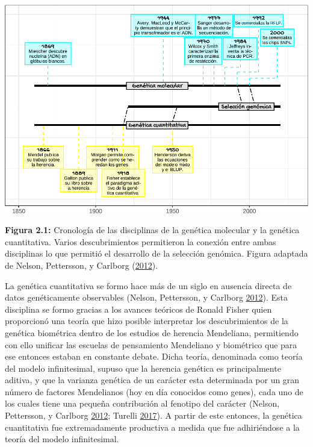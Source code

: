 \documentclass[11pt,spanish,a4paper,oneside,]{book} %
\begin{document}
\begin{center}\includegraphics[width=1\linewidth]{figures/Crono} \end{center}

\begin{center}
\textbf{Figura 2.1:} Cronología de las disciplinas de la genética molecular y la genética cuantitativa. Varios descubrimientos permitieron la conexión entre ambas disciplinas lo que permitió el desarrollo de la selección genómica. Figura adaptada de Nelson, Pettersson, y Carlborg (\protect\hyperlink{ref-cite:2}{2012}).

\end{center}

La genética cuantitativa se formo hace más de un siglo en ausencia directa de datos genéticamente observables (Nelson, Pettersson, y Carlborg \protect\hyperlink{ref-cite:2}{2012}). Esta disciplina se formo gracias a los avances teóricos de Ronald Fisher quien proporcionó una teoría que hizo posible interpretar los descubrimientos de la genética biométrica dentro de los estudios de herencia Mendeliana, permitiendo con ello unificar las escuelas de pensamiento Mendeliano y biométrico que para ese entonces estaban en constante debate. Dicha teoría, denominada como teoría del modelo infinitesimal, supuso que la herencia genética es principalmente aditiva, y que la varianza genética de un carácter esta determinada por un gran número de factores Mendelianos (hoy en día conocidos como genes), cada uno de los cuales tiene una pequeña contribución al fenotipo del carácter (Nelson, Pettersson, y Carlborg \protect\hyperlink{ref-cite:2}{2012}; Turelli \protect\hyperlink{ref-cite:9}{2017}). A partir de este entonces, la genética cuantitativa fue extremadamente productiva a medida que fue adhiriéndose a la teoría del modelo infinitesimal.
\end{document}

